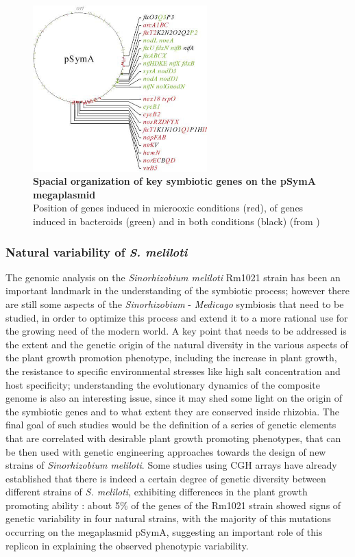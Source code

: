 \begin{figure}[!tb]
	\center
    \includegraphics[width=0.6\textwidth]{figures/Introduction/thesis_19}
	\caption{\label{fig:spacial}\textbf{Spacial organization of key symbiotic genes on the pSymA megaplasmid}\\
			Position of genes induced in microoxic conditions (red), of genes induced in bacteroids (green) and in both conditions (black) (from \cite{becker2004global})}
\end{figure}

\subsubsection{Natural variability of \textit{S. meliloti}}
The genomic analysis on the \textit{Sinorhizobium meliloti} Rm1021 strain has been an important landmark in the understanding of the symbiotic process; however there are still some aspects of the \textit{Sinorhizobium} - \textit{Medicago} symbiosis that need to be studied, in order to optimize this process and extend it to a more rational use for the growing need of the modern world. A key point that needs to be addressed is the extent and the genetic origin of the natural diversity in the various aspects of the plant growth promotion phenotype, including the increase in plant growth, the resistance to specific environmental stresses like high salt concentration and host specificity; understanding the evolutionary dynamics of the composite genome is also an interesting issue, since it may shed some light on the origin of the symbiotic genes and to what extent they are conserved inside rhizobia. The final goal of such studies would be the definition of a series of genetic elements that are correlated with desirable plant growth promoting phenotypes, that can be then used with genetic engineering approaches towards the design of new strains of \textit{Sinorhizobium meliloti}. Some studies using CGH arrays have already established that there is indeed a certain degree of genetic diversity between different strains of \textit{S. meliloti}, exhibiting differences in the plant growth promoting ability \cite{giuntini2005large}: about 5\% of the genes of the Rm1021 strain showed signs of genetic variability in four natural strains, with the majority of this mutations occurring on the megaplasmid pSymA, suggesting an important role of this replicon in explaining the observed phenotypic variability.

